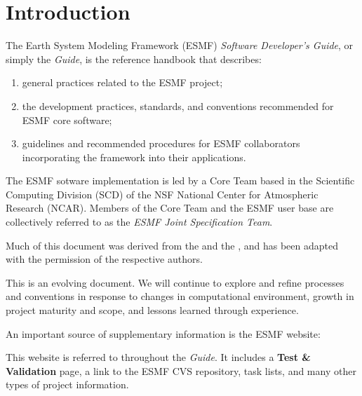 
\section{Introduction}
\label{sec:intro}

The Earth System Modeling Framework (ESMF) {\it Software Developer's Guide},
or simply the {\it Guide}, 
is the reference handbook that describes:
\begin{enumerate}
\item general practices related to the ESMF project;
\item the development practices, standards, and conventions recommended 
for ESMF core software;  
\item guidelines and recommended procedures for ESMF collaborators 
incorporating the framework into their applications.
\end{enumerate}

The ESMF sotware implementation is led by a Core Team based in the 
Scientific Computing Division (SCD) of the NSF National Center for Atmospheric 
Research (NCAR).  Members of the Core Team and the ESMF user base are 
collectively referred to as the {\it ESMF Joint Specification Team}.

Much of this document was derived from the 
\cite{FMSdevguide} and the 
\cite{CCSMdevguide}, and has been adapted with the permission of the respective authors.

This is an evolving document.  We will continue to explore and refine
processes and conventions in response to changes in computational 
environment, growth in project maturity and scope, and lessons learned
through experience.

An important source of supplementary information is the ESMF website:
\begin{center}
\end{center}
This website is referred to throughout the {\it Guide}.  
It includes a {\bf Test \& Validation} page, a link to the ESMF
CVS repository, task lists, and many other types of project information.

